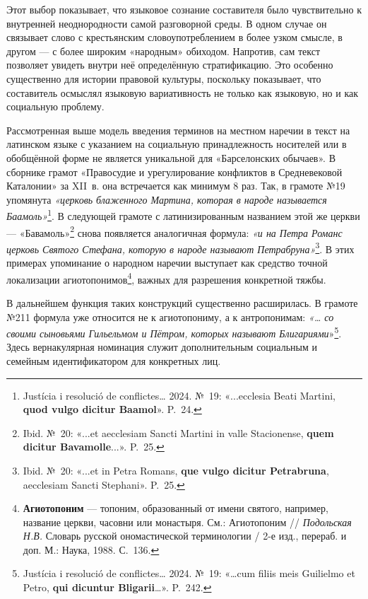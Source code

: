 Этот выбор показывает, что языковое сознание составителя было чувствительно к внутренней неоднородности самой разговорной среды. В одном случае он связывает слово с крестьянским словоупотреблением в более узком смысле, в другом --- с более широким «народным» обиходом. Напротив, сам текст позволяет увидеть внутри неё определённую стратификацию. Это особенно существенно для истории правовой культуры, поскольку показывает, что составитель осмыслял языковую вариативность не только как языковую, но и как социальную проблему.

Рассмотренная выше модель введения терминов на местном наречии в текст на латинском языке с указанием на социальную принадлежность носителей или в обобщённой форме не является уникальной для «Барселонских обычаев». В сборнике грамот «Правосудие и урегулирование конфликтов в Средневековой Каталонии» за XII~в. она встречается как минимум 8 раз. Так, в грамоте №19 упомянута \emph{«церковь блаженного Мартина, которая в народе называется Баамоль»}\footnote{Justícia i resolució de conflictes… 2024. №~19: «...ecclesia Beati Martini, \textbf{quod vulgo dicitur Baamol}». P.~24.}. В следующей грамоте с латинизированным названием этой же церкви --- «Бавамоль»\footnote{Ibid. №~20: «...et aecclesiam Sancti Martini in valle Stacionense, \textbf{quem dicitur Bavamolle}...». P.~25.} снова появляется аналогичная формула: \emph{«и на Петра Романс церковь Святого Стефана, которую в народе называют Петрабруна»}\footnote{Ibid. №~20: «...et in Petra Romans, \textbf{que vulgo dicitur Petrabruna}, aecclesiam Sancti Stephani». P.~25.}. В этих примерах упоминание о народном наречии выступает как средство точной локализации агиотопонимов\footnote{\textbf{Агиотопоним} --- топоним, образованный от имени святого, например, название церкви, часовни или монастыря. См.: Агиотопоним // \emph{Подольская Н.В.} Словарь русской ономастической терминологии / 2-е изд., перераб. и доп. М.: Наука, 1988. С.~136.}, важных для разрешения конкретной тяжбы.

В дальнейшем функция таких конструкций существенно расширилась. В грамоте №211 формула уже относится не к агиотопониму, а к антропонимам: \emph{«… со своими сыновьями Гильельмом и Пётром, которых называют Блигариями}»\footnote{Justícia i resolució de conflictes… 2024. №~19: «…cum filiis meis Guilielmo et Petro, \textbf{qui dicuntur Bligarii}…». P.~242.}. Здесь вернакулярная номинация служит дополнительным социальным и семейным идентификатором для конкретных лиц.


